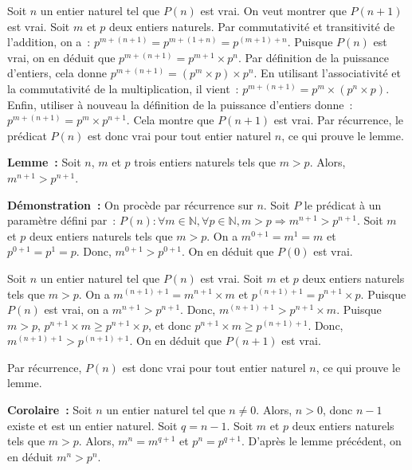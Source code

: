     Soit $n$ un entier naturel tel que $P(n)$ est vrai. 
    On veut montrer que $P(n+1)$ est vrai. 
    Soit $m$ et $p$ deux entiers naturels. 
    Par commutativité et transitivité de l'addition, on a : $p^{m+(n+1)} = p^{m+(1+n)} = p^{(m+1)+n}$. 
    Puisque $P(n)$ est vrai, on en déduit que $p^{m+(n+1)} = p^{m+1} \times p^n$. 
    Par définition de la puissance d'entiers, cela donne $p^{m+(n+1)} = (p^m \times p) \times p^n$. 
    En utilisant l'associativité et la commutativité de la multiplication, il vient : $p^{m+(n+1)} = p^m \times (p^n \times p)$. 
    Enfin, utiliser à nouveau la définition de la puissance d'entiers donne : $p^{m+(n+1)} = p^m \times p^{n+1}$. 
    Cela montre que $P(n+1)$ est vrai. 
    Par récurrence, le prédicat $P(n)$ est donc vrai pour tout entier naturel $n$, ce qui prouve le lemme. 

   \done 

\medskip

\noindent\textbf{Lemme :} Soit $n$, $m$ et $p$ trois entiers naturels tels que $m > p$. 
    Alors, $m^{n+1} > p^{n+1}$. 

\medskip

\noindent\textbf{Démonstration :} On procède par récurrence sur $n$. 
    Soit $P$ le prédicat à un paramètre défini par : $P(n): \forall m \in \mathbb{N}, \forall p \in \mathbb{N}, m > p \Rightarrow m^{n+1} > p^{n+1}$. 
    Soit $m$ et $p$ deux entiers naturels tels que $m > p$. 
    On a $m^{0+1} = m^1 = m$ et $p^{0+1} = p^1 = p$. 
    Donc, $m^{0+1} > p^{0+1}$. 
    On en déduit que $P(0)$ est vrai.

    Soit $n$ un entier naturel tel que $P(n)$ est vrai. 
    Soit $m$ et $p$ deux entiers naturels tels que $m > p$. 
    On a $m^{(n+1)+1} = m^{n+1} \times m$ et $p^{(n+1)+1} = p^{n+1} \times p$. 
    Puisque $P(n)$ est vrai, on a $m^{n+1} > p^{n+1}$. 
    Donc, $m^{(n+1)+1} > p^{n+1} \times m$. 
    Puisque $m > p$, $p^{n+1} \times m \geq p^{n+1} \times p$, et donc $p^{n+1} \times m \geq p^{(n+1)+1}$. 
    Donc, $m^{(n+1)+1} > p^{(n+1)+1}$. 
    On en déduit que $P(n+1)$ est vrai. 

    Par récurrence, $P(n)$ est donc vrai pour tout entier naturel $n$, ce qui prouve le lemme.

   \done 

\medskip

\noindent\textbf{Corolaire :} 
    Soit $n$ un entier naturel tel que $n \neq 0$. 
    Alors, $n > 0$, donc $n - 1$ existe et est un entier naturel.
    Soit $q = n - 1$. 
    Soit $m$ et $p$ deux entiers naturels tels que $m > p$.
    Alors, $m^n = m^{q+1}$ et $p^n = p^{q+1}$. 
    D'après le lemme précédent, on en déduit $m^n > p^n$. 

